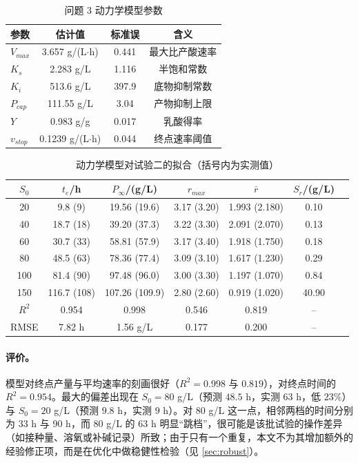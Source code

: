 \begin{table}[H]
\centering
\caption{问题 3 动力学模型参数}
\label{tab:q3kin}
\small
\begin{tabular}{lccc}
\toprule
参数 & 估计值 & 标准误 & 含义 \\
\midrule
$V_{max}$ & 3.657 g/(L$\cdot$h) & 0.441 & 最大比产酸速率 \\
$K_s$     & 2.283 g/L & 1.116 & 半饱和常数 \\
$K_i$     & 513.6 g/L & 397.9 & 底物抑制常数 \\
$P_{cap}$ & 111.55 g/L & 3.04 & 产物抑制上限 \\
$Y$       & 0.983 g/g & 0.017 & 乳酸得率 \\
$v_{stop}$& 0.1239 g/(L$\cdot$h) & 0.044 & 终点速率阈值 \\
\bottomrule
\end{tabular}
\end{table}

\begin{table}[H]
\centering
\caption{动力学模型对试验二的拟合（括号内为实测值）}
\label{tab:q3pred}
\small
\begin{tabular}{ccccccc}
\toprule
$S_0$ & $t_e$/h & $P_\infty$/(g/L) & $r_{max}$ & $\bar r$ & $S_r$/(g/L) \\
\midrule
20  & 9.8 (9)    & 19.56 (19.6) & 3.17 (3.20) & 1.993 (2.180) & 0.10 \\
40  & 18.7 (18)  & 39.20 (37.3) & 3.22 (3.30) & 2.091 (2.070) & 0.13 \\
60  & 30.7 (33)  & 58.81 (57.9) & 3.17 (3.40) & 1.918 (1.750) & 0.18 \\
80  & 48.5 (63)  & 78.36 (77.4) & 3.09 (3.10) & 1.617 (1.230) & 0.29 \\
100 & 81.4 (90)  & 97.48 (96.0) & 3.00 (3.30) & 1.197 (1.070) & 0.84 \\
150 & 116.7 (108)& 107.26 (109.9)& 2.80 (2.60) & 0.919 (1.020) & 40.90 \\
\midrule
$R^2$ & 0.954 & 0.998 & 0.546 & 0.819 & -- \\
RMSE  & 7.82 h & 1.56 g/L & 0.177 & 0.200 & -- \\
\bottomrule
\end{tabular}
\end{table}

\paragraph{评价。}模型对终点产量与平均速率的刻画很好（$R^2=0.998$ 与 $0.819$），对终点时间的 $R^2=0.954$。最大的偏差出现在 $S_0=80$ g/L（预测 $48.5$ h，实测 $63$ h，低 $23\%$）与 $S_0=20$ g/L（预测 $9.8$ h，实测 $9$ h）。对 80 g/L 这一点，相邻两档的时间分别为 33 h 与 90 h，而 80 g/L 的 63 h 明显“跳档”，很可能是该批试验的操作差异（如接种量、溶氧或补碱记录）所致；由于只有一个重复，本文不为其增加额外的经验修正项，而是在优化中做稳健性检验（见 \ref{sec:robust}）。

